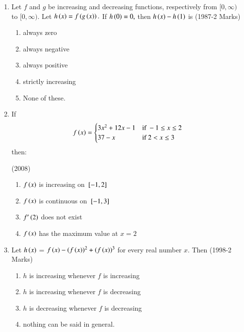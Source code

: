 \documentclass[journal,12pt,twocolumn]{IEEEtran}
\theoremstyle{remark}
\begin{document}
\begin{enumerate}
        \item
	Let $f$ and $g$ be increasing and decreasing functions, respectively from $[0,\infty)$ to $[0,\infty)$. Let $h\left(x\right) = f\left(g\left(x\right)\right).$ If $h\left(0\right) = 0,$ then $h\left(x\right)-h\left(1\right)$ is
	 \hfill(1987-2 Marks)
        \begin{enumerate}
          \item always zero
          \item always negative
          \item always positive
          \item strictly increasing
          \item None of these.\\
        \end{enumerate}

       \item 
       If 
	\begin{align*}
	 f\left(x\right)=\begin{cases} 
	 3x^2+12x-1 & \text{if }-1 \le x\le 2\\
	 37-x & \text{if } 2<x \le 3 
         \end{cases}
       \end{align*}then:

	 \hfill(2008)
       \begin{enumerate}
	 \item $f\left(x\right)$ is increasing on ${}\left[-1,2\right]$
	 \item $f\left(x\right)$ is continuous on ${}\left[-1,3\right]$
	 \item $f^{\prime}\left(2\right)$ does not exist
	 \item $f\left(x\right)$ has the maximum value at $x=2$\\
       \end{enumerate}

     \item
	     Let $h\left(x\right)$ = $f\left(x\right)-(f\left(x\right))^2+ (f\left(x\right))^3$  for every real number $x.$ Then
     \hfill(1998-2 Marks)\\
     \begin{enumerate}
      \item $h$ is increasing whenever $f$ is increasing
      \item $h$ is increasing whenever $f$ is decreasing
      \item $h$ is decreasing whenever $f$ is decreasing
      \item nothing can be said in general.\\
     \end{enumerate}
 \end{enumerate}
\end{document}

